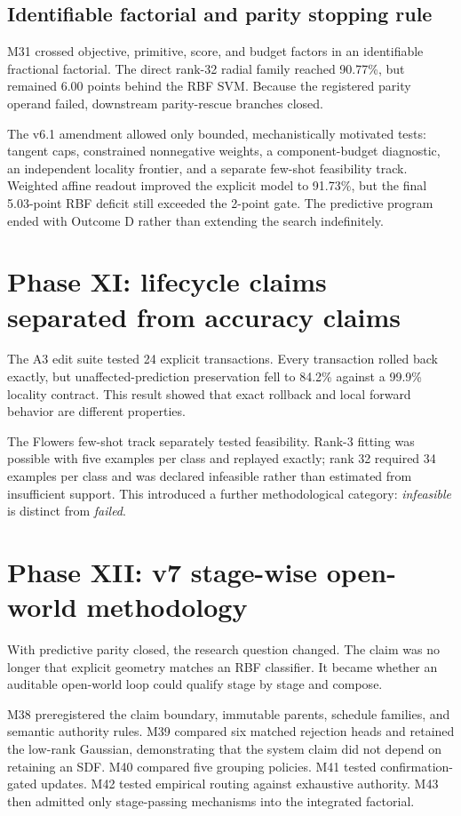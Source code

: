 \documentclass[12pt,oneside]{report}
\begin{document}
\subsection{Identifiable factorial and parity stopping rule}

M31 crossed objective, primitive, score, and budget factors in an identifiable
fractional factorial. The direct rank-32 radial family reached 90.77\%, but
remained 6.00 points behind the RBF SVM. Because the registered parity operand
failed, downstream parity-rescue branches closed.

The v6.1 amendment allowed only bounded, mechanistically motivated tests:
tangent caps, constrained nonnegative weights, a component-budget diagnostic,
an independent locality frontier, and a separate few-shot feasibility track.
Weighted affine readout improved the explicit model to 91.73\%, but the final
5.03-point RBF deficit still exceeded the 2-point gate. The predictive program
ended with Outcome D rather than extending the search indefinitely.

\section{Phase XI: lifecycle claims separated from accuracy claims}

The A3 edit suite tested 24 explicit transactions. Every transaction rolled
back exactly, but unaffected-prediction preservation fell to 84.2\% against a
99.9\% locality contract. This result showed that exact rollback and local
forward behavior are different properties.

The Flowers few-shot track separately tested feasibility. Rank-3 fitting was
possible with five examples per class and replayed exactly; rank 32 required
34 examples per class and was declared infeasible rather than estimated from
insufficient support. This introduced a further methodological category:
\emph{infeasible} is distinct from \emph{failed}.

\section{Phase XII: v7 stage-wise open-world methodology}

With predictive parity closed, the research question changed. The claim was no
longer that explicit geometry matches an RBF classifier. It became whether an
auditable open-world loop could qualify stage by stage and compose.

M38 preregistered the claim boundary, immutable parents, schedule families, and
semantic authority rules. M39 compared six matched rejection heads and retained
the low-rank Gaussian, demonstrating that the system claim did not depend on
retaining an SDF. M40 compared five grouping policies. M41 tested confirmation-
gated updates. M42 tested empirical routing against exhaustive authority.
M43 then admitted only stage-passing mechanisms into the integrated factorial.
\end{document}
